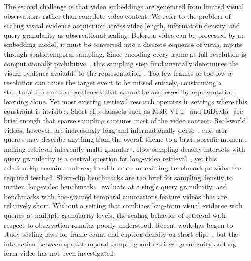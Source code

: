 The second challenge is that video embeddings are generated from limited visual observations rather than complete video content. We refer to the problem of scaling visual evidence acquisition across video length, information density, and query granularity as observational scaling. Before a video can be processed by an embedding model, it must be converted into a discrete sequence of visual inputs through spatiotemporal sampling. Since encoding every frame at full resolution is computationally prohibitive~\cite{hu2022mmsampler}, this sampling step fundamentally determines the visual evidence available to the representation~\cite{guo2025gve}. Too few frames or too low a resolution can cause the target event to be missed entirely, constituting a structural information bottleneck that cannot be addressed by representation learning alone. Yet most existing retrieval research operates in settings where this constraint is invisible. Short-clip datasets such as MSR-VTT~\cite{xu2016msr} and DiDeMo~\cite{anne2017localizing} are brief enough that sparse sampling captures most of the video content. Real-world videos, however, are increasingly long and informationally dense~\cite{henschel2025streamingt2v,weng2024longvlm}, and user queries may describe anything from the overall theme to a brief, specific moment, making retrieval inherently multi-granular~\cite{xiao2022video,chen2023joint}. How sampling density interacts with query granularity is a central question for long-video retrieval~\cite{wang2025cross}, yet this relationship remains underexplored because no existing benchmark provides the required testbed. Short-clip benchmarks are too brief for sampling density to matter, long-video benchmarks~\cite{cai2025lovr} evaluate at a single query granularity, and benchmarks with fine-grained temporal annotations feature videos that are relatively short. Without a setting that combines long-form visual evidence with queries at multiple granularity levels, the scaling behavior of retrieval with respect to observation remains poorly understood. Recent work has begun to study scaling laws for frame count and caption density on short clips~\cite{zhu2025dynamic}, but the interaction between spatiotemporal sampling and retrieval granularity on long-form video has not been investigated.

